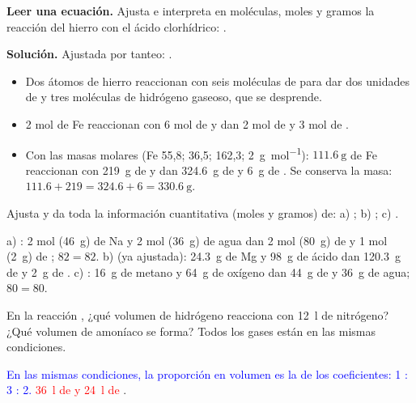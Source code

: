 \begin{example}
    \textbf{Leer una ecuación.} Ajusta e interpreta en moléculas, moles y gramos la reacción del hierro con el ácido clorhídrico:
    .

    \textbf{Solución.} Ajustada por tanteo: .
    \begin{itemize}
        \item Dos átomos de hierro reaccionan con seis moléculas de  para dar dos unidades de  y tres moléculas
        de hidrógeno gaseoso, que se desprende.
        \item 2 mol de Fe reaccionan con 6 mol de  y dan 2 mol de  y 3 mol de .
        \item Con las masas molares (Fe 55,8;  36,5;  162,3;  \qty{2}{\gram\per\mol}):
        \(\qty{111.6}{\gram}\) de Fe reaccionan con \qty{219}{\gram} de  y dan \qty{324.6}{\gram} de  y
        \qty{6}{\gram} de . Se conserva la masa: \(\num{111.6} + 219 = \num{324.6} + 6 = \qty{330.6}{\gram}\).
    \end{itemize}
\end{example}

\begin{exercise}
    Ajusta y da toda la información cuantitativa (moles y gramos) de: a) ;
    b) ; c) .
    \begin{solu}
        a) \textcolor{red}{}: 2 mol (\qty{46}{\gram}) de Na y 2 mol (\qty{36}{\gram}) de agua dan
        2 mol (\qty{80}{\gram}) de  y 1 mol (\qty{2}{\gram}) de ; \(82 = 82\).
        b) \textcolor{red}{} (ya ajustada): \qty{24.3}{\gram} de Mg y \qty{98}{\gram} de ácido dan
        \qty{120.3}{\gram} de  y \qty{2}{\gram} de .
        c) \textcolor{red}{}: \qty{16}{\gram} de metano y \qty{64}{\gram} de oxígeno dan
        \qty{44}{\gram} de  y \qty{36}{\gram} de agua; \(80 = 80\).
    \end{solu}
\end{exercise}

\begin{exercise}
    En la reacción , ¿qué volumen de hidrógeno reacciona con \qty{12}{\litre} de nitrógeno?
    ¿Qué volumen de amoníaco se forma? Todos los gases están en las mismas condiciones.
    \begin{solu}
        \textcolor{blue}{En las mismas condiciones, la proporción en volumen es la de los coeficientes: 1 : 3 : 2.}
        \textcolor{red}{\qty{36}{\litre} de  y \qty{24}{\litre} de }.
    \end{solu}
\end{exercise}

